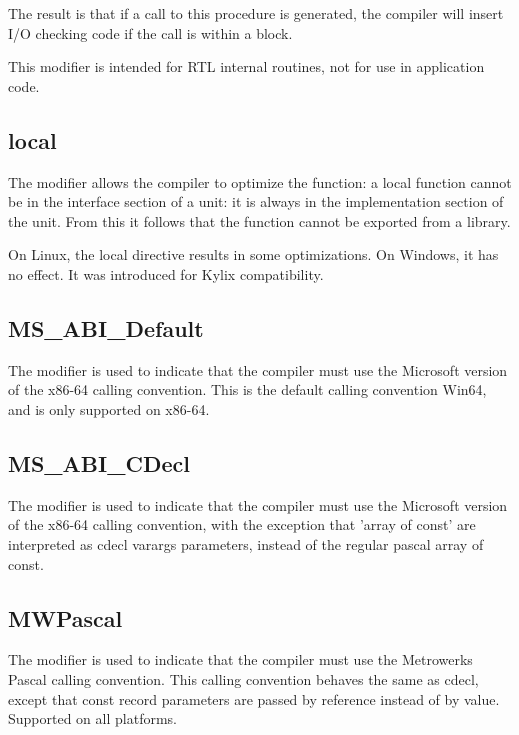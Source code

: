 The result is that if a call to this procedure is generated, the compiler will
insert I/O checking code if the call is within a  block.

This modifier is intended for RTL internal routines, not for use in
application code.

\subsection{local}
\label{se:local}
The  modifier allows the compiler to optimize the function: a local
function cannot be in the interface section of a unit: it is always in the
implementation section of the unit. From this it follows that the function
cannot be exported from a library.

On Linux, the local directive results in some optimizations. On Windows, it
has no effect. It was introduced for Kylix compatibility.

\subsection{MS\_ABI\_Default}
The  modifier is used to indicate that the compiler must
use the Microsoft version of the x86-64 calling convention. This is the default
calling convention Win64, and is only supported on x86-64.


\subsection{MS\_ABI\_CDecl}
The  modifier is used to indicate that the compiler must
use the Microsoft version of the x86-64 calling convention, with the
exception that 'array of const' are interpreted as cdecl varargs parameters,
instead of the regular pascal array of const.




\subsection{MWPascal}
The  modifier is used to indicate that the compiler must
use the Metrowerks Pascal calling convention. This calling convention behaves the same as
cdecl, except that const record parameters are passed by reference
instead of by value. Supported on all platforms.



